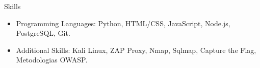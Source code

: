 \documentclass[]{mcdowellcv}
\begin{document}
\begin{cvsection}{Skills}
	\begin{cvsubsection}{}{}{}
		\begin{itemize}
			\item Programming Languages: Python, HTML/CSS, JavaScript, Node.js, PostgreSQL, Git.
			\item Additional Skills: Kali Linux, ZAP Proxy, Nmap, Sqlmap, Capture the Flag, Metodologias OWASP.
		\end{itemize}
	\end{cvsubsection}
\end{cvsection}
\end{document}
